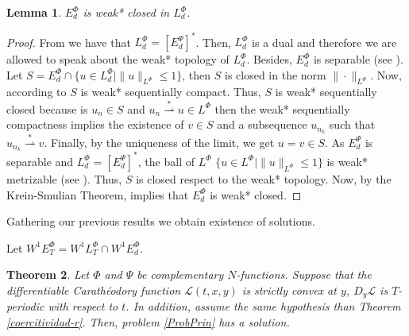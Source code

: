 \documentclass[twoside]{article}
\newtheorem{thm}{Theorem}[section]
\newtheorem{lem}[thm]{Lemma}
\theoremstyle{remark}
\newcommand{\orlnor}{\|_{L^{\Phi}}}
\newcommand{\lphi}{L^{\Phi}}
\newcommand{\ephi}{E^{\Phi}}
\newcommand{\wphi}{W^{1}\lphi}
\newcommand{\wphiet}{W^{1}\ephi_T}
\newcommand{\wphie}{W^{1}\ephi}
\renewcommand{\leq}{\leqslant}
\newcommand{\epsi}{E^{\Psi}}
\begin{document}
\begin{lem}\label{lem:deb*cerrado}
$\ephi_d$ is weak* closed in $\lphi_d$.
\end{lem}


\begin{proof}
From \cite[Thm. 7, p. 110]{rao1991theory} we have that $\lphi_d=\left[\epsi_d\right]^*
$.
Then, $\lphi_d$ is a dual and therefore we are allowed to speak about the weak* topology of $\lphi_d$.
Besides, $\ephi_d
$ is separable (see \cite[Thm. 1, p. 87]{rao1991theory}).
Let $S=\ephi_d\cap \{u \in \lphi_d|\|u\orlnor\leq 1\}$, then $S$ is closed in the norm $\|\cdot\orlnor$. Now, according to \cite[Cor. 5, p. 148]{rao1991theory} $S$ is weak* sequentially compact. Thus, $S$ is weak* sequentially closed because 
is $u_n\in S$ and
$u_n \overset{*}{\rightharpoonup}u \in \lphi$ then  the weak* sequentially compactness implies the existence of $v \in S$ and a subsequence $u_{n_k}$ such that 
$u_{n_k}\overset{*}{\rightharpoonup}v$. Finally, by the uniqueness of   the limit, we get
$u=v\in S$.
As $\epsi_d$ is separable and $\lphi_d=\left[\epsi_d\right]^*$, the ball of $\lphi$ $\{u \in \lphi | \|u\orlnor\leq 1\}$ is  weak* metrizable (see \cite[Thm. 5.1, p. 138]{Conway1977}).
Thus, $S$ is closed respect to  the weak* topology. Now, by the Krein-Smulian Theorem, \cite[Cor. 12.6, p. 165]{Conway1977} implies that $\ephi_d$ is weak* closed.
\end{proof}

Gathering our previous results we obtain existence of solutions.

Let $\wphiet=\wphi_T \cap \wphie_d$.


\begin{thm} 
Let $\Phi$ and $\Psi$ be complementary $N$-functions. 
Suppose that the differentiable Carath\'eodory function $\mathcal{L}(t,x,y)$ is strictly convex at $y$, $D_{y}\mathcal{L}$ is $T$-periodic with respect to $t$. In addition, assume the same hypothesis than Theorem \ref{coercitividad-r}. Then, problem \eqref{ProbPrin} has a solution.
\end{thm}
\end{document}
